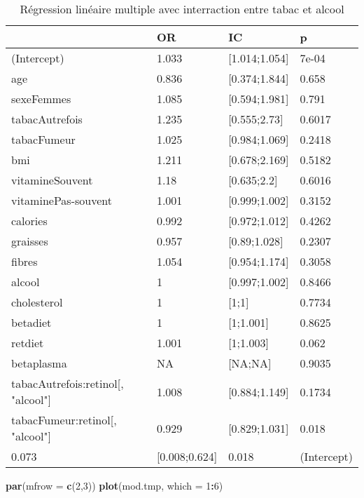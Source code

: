 \documentclass[]{article}
\newenvironment{Shaded}{\begin{snugshade}}{\end{snugshade}}
\newcommand{\KeywordTok}[1]{\textcolor[rgb]{0.13,0.29,0.53}{\textbf{#1}}}
\newcommand{\DataTypeTok}[1]{\textcolor[rgb]{0.13,0.29,0.53}{#1}}
\newcommand{\DecValTok}[1]{\textcolor[rgb]{0.00,0.00,0.81}{#1}}
\newcommand{\OperatorTok}[1]{\textcolor[rgb]{0.81,0.36,0.00}{\textbf{#1}}}
\newcommand{\NormalTok}[1]{#1}
\begin{document}
\begin{table}

\caption{\label{tab:unnamed-chunk-85}Régression linéaire multiple avec interraction entre tabac et alcool}
\centering
\begin{tabular}[t]{l|l|l|l}
\hline
  & OR & IC & p\\
\hline
\rowcolor[HTML]{BBD2E1}  (Intercept) & 1.033 & [1.014;1.054] & 7e-04\\
\hline
age & 0.836 & [0.374;1.844] & 0.658\\
\hline
\rowcolor[HTML]{BBD2E1}  sexeFemmes & 1.085 & [0.594;1.981] & 0.791\\
\hline
tabacAutrefois & 1.235 & [0.555;2.73] & 0.6017\\
\hline
\rowcolor[HTML]{BBD2E1}  tabacFumeur & 1.025 & [0.984;1.069] & 0.2418\\
\hline
bmi & 1.211 & [0.678;2.169] & 0.5182\\
\hline
\rowcolor[HTML]{BBD2E1}  vitamineSouvent & 1.18 & [0.635;2.2] & 0.6016\\
\hline
vitaminePas-souvent & 1.001 & [0.999;1.002] & 0.3152\\
\hline
\rowcolor[HTML]{BBD2E1}  calories & 0.992 & [0.972;1.012] & 0.4262\\
\hline
graisses & 0.957 & [0.89;1.028] & 0.2307\\
\hline
\rowcolor[HTML]{BBD2E1}  fibres & 1.054 & [0.954;1.174] & 0.3058\\
\hline
alcool & 1 & [0.997;1.002] & 0.8466\\
\hline
\rowcolor[HTML]{BBD2E1}  cholesterol & 1 & [1;1] & 0.7734\\
\hline
betadiet & 1 & [1;1.001] & 0.8625\\
\hline
\rowcolor[HTML]{BBD2E1}  retdiet & 1.001 & [1;1.003] & 0.062\\
\hline
betaplasma & NA & [NA;NA] & 0.9035\\
\hline
\rowcolor[HTML]{BBD2E1}  tabacAutrefois:retinol[, "alcool"] & 1.008 & [0.884;1.149] & 0.1734\\
\hline
tabacFumeur:retinol[, "alcool"] & 0.929 & [0.829;1.031] & 0.018\\
\hline
\rowcolor[HTML]{BBD2E1}  0.073 & [0.008;0.624] & 0.018 & (Intercept)\\
\hline
\end{tabular}
\end{table}

\begin{Shaded}
\begin{Highlighting}[]
\KeywordTok{par}\NormalTok{(}\DataTypeTok{mfrow =} \KeywordTok{c}\NormalTok{(}\DecValTok{2}\NormalTok{,}\DecValTok{3}\NormalTok{))}
\KeywordTok{plot}\NormalTok{(mod.tmp, }\DataTypeTok{which =} \DecValTok{1}\OperatorTok{:}\DecValTok{6}\NormalTok{)}
\end{Highlighting}
\end{Shaded}
\end{document}
